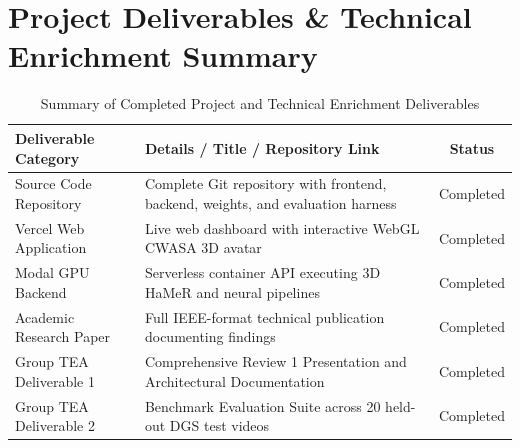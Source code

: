 \documentclass[11pt, a4paper]{article}
\begin{document}
\section{Project Deliverables \& Technical Enrichment Summary}
\begin{table}[H]
    \centering
    \footnotesize
    \renewcommand{\arraystretch}{1.2}
    \begin{tabular}{|p{4.2cm}|p{7.5cm}|c|}
        \hline
        \textbf{Deliverable Category} & \textbf{Details / Title / Repository Link} & \textbf{Status} \\
        \hline
        Source Code Repository & Complete Git repository with frontend, backend, weights, and evaluation harness & Completed \\
        \hline
        Vercel Web Application & Live web dashboard with interactive WebGL CWASA 3D avatar & Completed \\
        \hline
        Modal GPU Backend & Serverless container API executing 3D HaMeR and neural pipelines & Completed \\
        \hline
        Academic Research Paper & Full IEEE-format technical publication documenting findings & Completed \\
        \hline
        Group TEA Deliverable 1 & Comprehensive Review 1 Presentation and Architectural Documentation & Completed \\
        \hline
        Group TEA Deliverable 2 & Benchmark Evaluation Suite across 20 held-out DGS test videos & Completed \\
        \hline
    \end{tabular}
    \caption{Summary of Completed Project and Technical Enrichment Deliverables}
\end{table}
\end{document}
